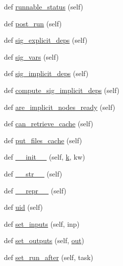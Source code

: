 \begin{DoxyCompactItemize}
\item 
def \hyperlink{classwaflib_1_1_task_1_1_task_a2a281aaea77a0732f72103cfe4bc56c4}{runnable\+\_\+status} (self)
\item 
def \hyperlink{classwaflib_1_1_task_1_1_task_ac7c2e0bf22acd7d96399b1ca7f342232}{post\+\_\+run} (self)
\item 
def \hyperlink{classwaflib_1_1_task_1_1_task_a76a53025fb59fd6096f988ff64481070}{sig\+\_\+explicit\+\_\+deps} (self)
\item 
def \hyperlink{classwaflib_1_1_task_1_1_task_acffd01af005b390787b85239ac207282}{sig\+\_\+vars} (self)
\item 
def \hyperlink{classwaflib_1_1_task_1_1_task_a60ce159ef323481b09fcea4decb9e231}{sig\+\_\+implicit\+\_\+deps} (self)
\item 
def \hyperlink{classwaflib_1_1_task_1_1_task_adf3f63ea77fbca592ebc4244ba57887d}{compute\+\_\+sig\+\_\+implicit\+\_\+deps} (self)
\item 
def \hyperlink{classwaflib_1_1_task_1_1_task_a89612661d2073f53f62d7306a6c2238d}{are\+\_\+implicit\+\_\+nodes\+\_\+ready} (self)
\item 
def \hyperlink{classwaflib_1_1_task_1_1_task_a2085cfed25d49bed519af381621b29e7}{can\+\_\+retrieve\+\_\+cache} (self)
\item 
def \hyperlink{classwaflib_1_1_task_1_1_task_adf5e108580503738b2ab58eb1b56c10f}{put\+\_\+files\+\_\+cache} (self)
\item 
def \hyperlink{classwaflib_1_1_task_1_1_task_a566ab609bec4499aeab7bcd6f77f156e}{\+\_\+\+\_\+init\+\_\+\+\_\+} (self, \hyperlink{rfft2d_test_m_l_8m_adc468c70fb574ebd07287b38d0d0676d}{k}, kw)
\item 
def \hyperlink{classwaflib_1_1_task_1_1_task_a2507ae71718d699910a9dd8708664630}{\+\_\+\+\_\+str\+\_\+\+\_\+} (self)
\item 
def \hyperlink{classwaflib_1_1_task_1_1_task_ac05a045661750df307593224089759da}{\+\_\+\+\_\+repr\+\_\+\+\_\+} (self)
\item 
def \hyperlink{classwaflib_1_1_task_1_1_task_a910c51ea67c1c47ac40690bbba73b76a}{uid} (self)
\item 
def \hyperlink{classwaflib_1_1_task_1_1_task_a647c971bbca84d07daeff8d24f70ea18}{set\+\_\+inputs} (self, inp)
\item 
def \hyperlink{classwaflib_1_1_task_1_1_task_a8e650ed64c8370720574ebd8481a4f48}{set\+\_\+outputs} (self, \hyperlink{latency_8c_a71fd1c281affec034757279e4f91c50b}{out})
\item 
def \hyperlink{classwaflib_1_1_task_1_1_task_a84292828c5a6cf3282027ed8ce5c7822}{set\+\_\+run\+\_\+after} (self, task)

\end{DoxyCompactItemize}
